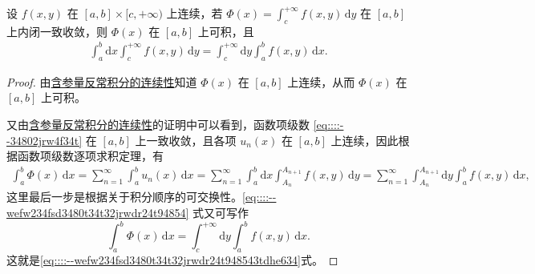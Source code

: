 \documentclass[../../main.tex]{subfiles}%
\begin{document}
\begin{theorem}[可积性]\label{theorem:含参量反常积分可积性定理}
设 \( f(x,y) \) 在 \( [a,b] \times [c, +\infty) \) 上连续，若 \( \Phi(x) = \int_{c}^{+\infty} f(x,y) \, \mathrm{d}y \) 在 \( [a,b] \) 上内闭一致收敛，则 \( \Phi(x) \) 在 \( [a,b] \) 上可积，且
\begin{align}\label{eq::::--wefw234fsd3480t34t32jrwdr24t948543tdhe634}
\int_{a}^{b} \mathrm{d}x \int_{c}^{+\infty} f(x,y) \, \mathrm{d}y = \int_{c}^{+\infty} \mathrm{d}y \int_{a}^{b} f(x,y) \, \mathrm{d}x.
\end{align}
\end{theorem}
\begin{proof}

由\hyperref[theorem:含参量反常积分的连续性]{含参量反常积分的连续性}知道 \( \Phi(x) \) 在 \( [a,b] \) 上连续，从而 \( \Phi(x) \) 在 \( [a,b] \) 上可积。

又由\hyperref[theorem:含参量反常积分的连续性]{含参量反常积分的连续性}的证明中可以看到，函数项级数 \eqref{eq::::--34802jrw4f34t} 在 \( [a,b] \) 上一致收敛，且各项 \( u_n(x) \) 在 \( [a,b] \) 上连续，因此根据函数项级数逐项求积定理，有
\begin{align}\label{eq::::--wefw234fsd3480t34t32jrwdr24t94854}
\int_{a}^{b} \Phi(x) \, \mathrm{d}x = \sum_{n=1}^{\infty} \int_{a}^{b} u_n(x) \, \mathrm{d}x = \sum_{n=1}^{\infty} \int_{a}^{b} \mathrm{d}x \int_{A_n}^{A_{n+1}} f(x,y) \, \mathrm{d}y = \sum_{n=1}^{\infty} \int_{A_n}^{A_{n+1}} \mathrm{d}y \int_{a}^{b} f(x,y) \, \mathrm{d}x,
\end{align}
这里最后一步是根据关于积分顺序的可交换性。\eqref{eq::::--wefw234fsd3480t34t32jrwdr24t94854} 式又可写作
\[
\int_{a}^{b} \Phi(x) \, \mathrm{d}x = \int_{c}^{+\infty} \mathrm{d}y \int_{a}^{b} f(x,y) \, \mathrm{d}x.
\]
这就是\eqref{eq::::--wefw234fsd3480t34t32jrwdr24t948543tdhe634}式。

\end{proof}
\end{document}
